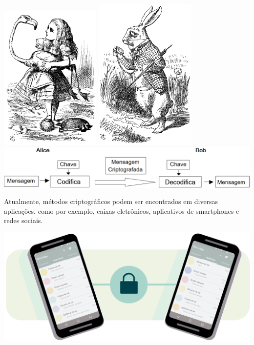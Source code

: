 \documentclass{sciposter}
\begin{document}
\begin{multicols*}{2}
{\vspace{1cm}
\hspace{3cm}
\includegraphics[width=5cm]{alice2}
\hspace{15.5cm}
\includegraphics[width=5cm]{bob2}\\

\includegraphics[width=33cm]{classiccript}

\vspace{1cm}
\par Atualmente, métodos criptográficos podem ser encontrados em diversas aplicações, como por exemplo, caixas eletrônicos, aplicativos de smartphones e redes sociais.

\vspace{1cm}
\hspace{6cm}
\includegraphics[width=21cm]{cripto_cell}





}
\end{multicols*}
\end{document}
